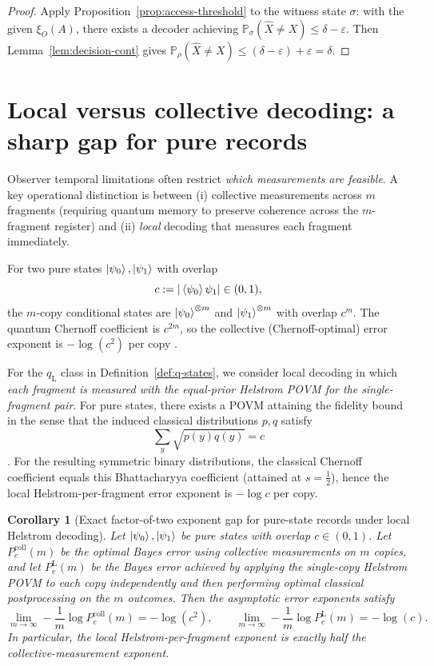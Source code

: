 \documentclass[11pt]{article}
\newcommand{\Prob}{\mathbb{P}}
\newcommand{\1}{\mathbf{1}}
\newcommand{\QCBdist}{\xi}
\theoremstyle{definition}
\theoremstyle{plain}
\newtheorem{corollary}{Corollary}
\begin{document}
\begin{proof}
Apply Proposition~\ref{prop:access-threshold} to the witness state $\sigma$: with the given $\QCBdist_O(A)$, there exists a decoder achieving
$\Prob_{\sigma}(\widehat{X}\neq X)\le \delta-\varepsilon$.
Then Lemma~\ref{lem:decision-cont} gives
$\Prob_{\rho}(\widehat{X}\neq X)\le (\delta-\varepsilon)+\varepsilon=\delta$.
\end{proof}

\section{Local versus collective decoding: a sharp gap for pure records}
\label{sec:local-vs-global}

Observer temporal limitations often restrict \emph{which measurements are feasible}.
A key operational distinction is between (i) collective measurements across $m$ fragments (requiring quantum memory to preserve coherence across the $m$-fragment register) and (ii) \emph{local} decoding that measures each fragment immediately.

For two pure states $\ket{\psi_0},\ket{\psi_1}$ with overlap
\[
c:=|\braket{\psi_0}{\psi_1}|\in(0,1),
\]
the $m$-copy conditional states are $\ket{\psi_0}^{\otimes m}$ and $\ket{\psi_1}^{\otimes m}$ with overlap $c^m$.
The quantum Chernoff coefficient is $c^{2m}$, so the collective (Chernoff-optimal) error exponent is $-\log(c^2)$ per copy \citep{Audenaert2007,NussbaumSzkola2009}.

For the $q_{\mathrm{L}}$ class in Definition~\ref{def:q-states}, we consider local decoding in which \emph{each fragment is measured with the equal-prior Helstrom POVM for the single-fragment pair}.
For pure states, there exists a POVM attaining the fidelity bound in the sense that the induced classical distributions $p,q$ satisfy
\[
\sum_y \sqrt{p(y)q(y)} = c
\]
\citep{FuchsCaves1994,Jozsa1994}.
For the resulting symmetric binary distributions, the classical Chernoff coefficient equals this Bhattacharyya coefficient (attained at $s=\tfrac12$), hence the local Helstrom-per-fragment error exponent is $-\log c$ per copy.

\begin{corollary}[Exact factor-of-two exponent gap for pure-state records under local Helstrom decoding]
\label{cor:factor-two-gap}
Let $\ket{\psi_0},\ket{\psi_1}$ be pure states with overlap $c\in(0,1)$.
Let $P^{\mathrm{coll}}_e(m)$ be the optimal Bayes error using \emph{collective} measurements on $m$ copies, and let $P^{\mathrm{L}}_e(m)$ be the Bayes error achieved by applying the single-copy Helstrom POVM to each copy independently and then performing optimal classical postprocessing on the $m$ outcomes.
Then the asymptotic error exponents satisfy
\[
\lim_{m\to\infty}-\frac1m\log P^{\mathrm{coll}}_e(m)= -\log(c^2),
\qquad
\lim_{m\to\infty}-\frac1m\log P^{\mathrm{L}}_e(m)= -\log(c).
\]
In particular, the local Helstrom-per-fragment exponent is exactly half the collective-measurement exponent.
\end{corollary}
\end{document}
